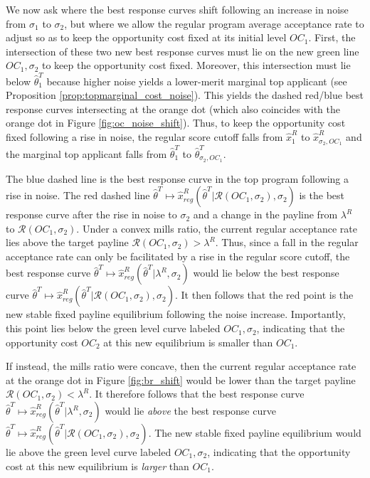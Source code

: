 \documentclass[12pt,reqno]{amsart}
\theoremstyle{definition}
\theoremstyle{plain} %
\begin{document}
\noindent We now ask where the best response curves shift following an increase in noise from $\sigma_1$ to $\sigma_2$, but where we allow the regular program average acceptance rate to adjust so as to keep the opportunity cost fixed at its initial level $OC_1$. First, the intersection of these two new best response curves must lie on the new green line $OC_1,\sigma_2$ to keep the opportunity cost fixed. Moreover, this intersection must lie below $\hat{\theta}_1^T$ because higher noise yields a lower-merit marginal top applicant (see Proposition \ref{prop:topmarginal_cost_noise}). This yields the dashed red/blue best response curves intersecting at the orange dot (which also coincides with the orange dot in Figure \ref{fig:oc_noise_shift}). Thus, to keep the opportunity cost fixed following a rise in noise, the regular score cutoff falls from $\hat{x}^R_1$ to $\hat{x}^R_{\sigma_2,OC_1}$ and the marginal top applicant falls from $\hat{\theta}_1^T$ to $\hat{\theta}_{\sigma_2,OC_1}^T$. 

\noindent The blue dashed line is the best response curve in the top program following a rise in noise. The red dashed line $\hat{\theta}^T\mapsto \hat{x}^R_{reg}(\hat{\theta}^T|\mathcal{R}(OC_1,\sigma_2),\sigma_2)$ is the best response curve after the rise in noise to $\sigma_2$ and a change in the payline from $\lambda^R$ to $\mathcal{R}(OC_1,\sigma_2)$. Under a convex mills ratio, the current regular acceptance rate lies above the target payline $\mathcal{R}(OC_1,\sigma_2)>\lambda^R$. Thus, since a fall in the regular acceptance rate can only be facilitated by a rise in the regular score cutoff, the best response curve $\hat{\theta}^T\mapsto \hat{x}^R_{reg}(\hat{\theta}^T|\lambda^R,\sigma_2)$ would lie below the best response curve $\hat{\theta}^T\mapsto \hat{x}^R_{reg}(\hat{\theta}^T|\mathcal{R}(OC_1,\sigma_2),\sigma_2)$. It then follows that the red point is the new stable fixed payline equilibrium following the noise increase. Importantly, this point lies below the green level curve labeled $OC_1,\sigma_2$, indicating that the opportunity cost $OC_2$ at this new equilibrium is smaller than $OC_1$. 

\noindent If instead, the mills ratio were concave, then the current regular acceptance rate at the orange dot in Figure \ref{fig:br_shift} would be lower than the target payline $\mathcal{R}(OC_1,\sigma_2)<\lambda^R$. It therefore follows that the best response curve $\hat{\theta}^T\mapsto \hat{x}^R_{reg}(\hat{\theta}^T|\lambda^R,\sigma_2)$ would lie \textit{above} the best response curve $\hat{\theta}^T\mapsto \hat{x}^R_{reg}(\hat{\theta}^T|\mathcal{R}(OC_1,\sigma_2),\sigma_2)$. The new stable fixed payline equilibrium would lie above the green level curve labeled $OC_1,\sigma_2$, indicating that the opportunity cost at this new equilibrium is \textit{larger} than $OC_1$. 
\end{document}
